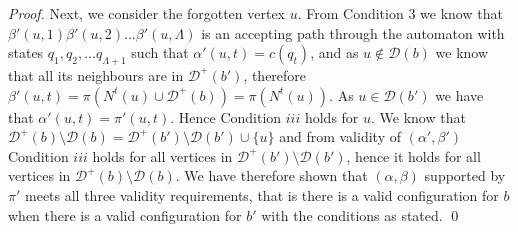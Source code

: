 \documentclass[runningheads]{llncs}
\begin{document}
\begin{proof}
Next, we consider the forgotten vertex $u$. From Condition $3$ we know that $ \beta'(u,1)\beta'(u,2)...\beta'(u,\Lambda)$ is an accepting path through the automaton with states $q_1,q_2,...q_{\Lambda+1}$ such that $\alpha'(u,t)=c(q_t)$, and as $u \notin \mathcal{D}(b)$ we know that all its neighbours are in $\mathcal{D}^+(b')$, therefore $\beta'(u,t)=\pi(N^t(u) \cup\mathcal{D}^+(b))=\pi(N^t(u))$. As $u \in \mathcal{D}(b')$ we have that $\alpha'(u,t)=\pi'(u,t)$. Hence Condition $iii$ holds for $u$. 
We know that $\mathcal{D}^+(b) \setminus \mathcal{D}(b)=\mathcal{D}^+(b') \setminus \mathcal{D}(b') \cup \{u\}$ and from validity of $(\alpha',\beta')$ Condition $iii$ holds for all vertices in $\mathcal{D}^+(b') \setminus \mathcal{D}(b')$, hence it holds for all vertices in $\mathcal{D}^+(b) \setminus \mathcal{D}(b)$.
We have therefore shown that $(\alpha,\beta)$ supported by $\pi'$ meets all three validity requirements, that is there is a valid configuration for $b$ when there is a valid configuration for $b'$ with the conditions as stated.
\qed \end{proof}
\end{document}
